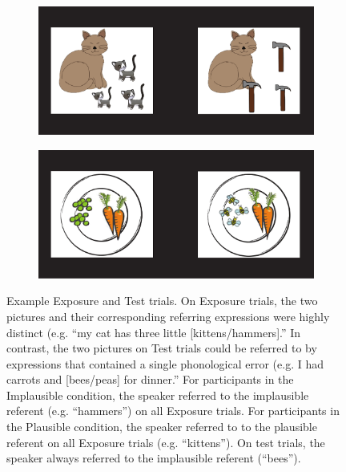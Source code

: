\documentclass[man,floatsintext]{apa6}
\begin{document}
\begin{figure}[tb]
     \centering
        \begin{subfigure}[b]{.4 \textwidth}
            \caption{\label{fig:exposure}}
            \includegraphics[width=\textwidth]{figures/exposure.pdf}
        \end{subfigure}\quad
        \vspace{12 pt}
        \begin{subfigure}[b]{.4 \textwidth}
           \caption{\label{fig:test}}
           \includegraphics[width=\textwidth]{figures/testing.pdf}
        \end{subfigure}
    \caption{Example Exposure and Test trials. On Exposure trials, the two pictures and their corresponding referring expressions were highly distinct (e.g. ``my cat has three little [kittens/hammers].'' In contrast, the two pictures on Test trials could be referred to by expressions that contained a single phonological error (e.g. I had carrots and [bees/peas] for dinner.'' For participants in the Implausible condition, the speaker referred to the implausible referent (e.g. ``hammers'') on all Exposure trials. For participants in the Plausible condition, the speaker referred to to the plausible referent on all Exposure trials (e.g. ``kittens''). On test trials, the speaker always referred to the implausible referent (``bees'').}
   \label{fig:stimuli}
\end{figure}
\end{document}
